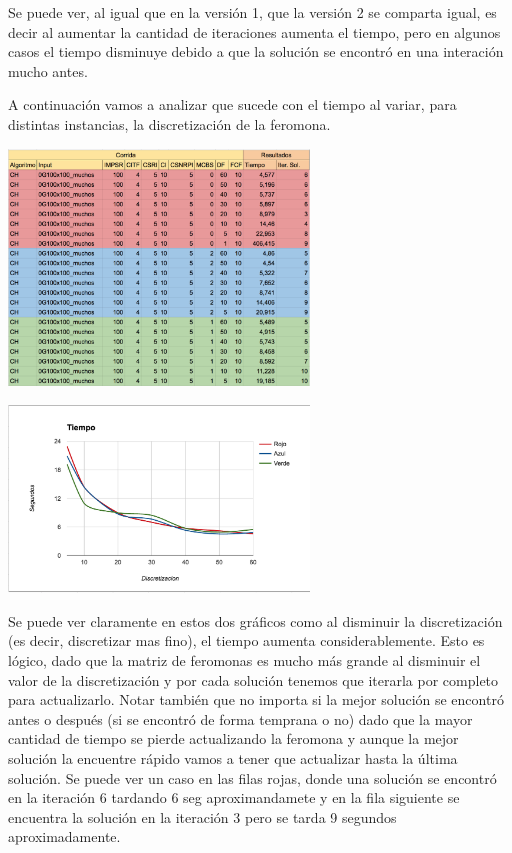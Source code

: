 Se puede ver, al igual que en la versi\'on 1, que la versi\'on 2 se comparta igual, es decir al aumentar la cantidad de iteraciones aumenta el tiempo, pero en algunos casos el tiempo disminuye debido a que la soluci\'on se encontr\'o en una interaci\'on mucho antes.

A continuaci\'on vamos a analizar que sucede con el tiempo al variar, para distintas instancias, la discretizaci\'on de la feromona. 

\begin{center}
\includegraphics[width=0.6\textwidth]{imagenes/tabla5}
\end{center}



\begin{center}
\includegraphics[width=0.6\textwidth]{imagenes/grafico3}
\end{center}




Se puede ver claramente en estos dos gr\'aficos como al disminuir la discretizaci\'on (es decir, discretizar mas fino), el tiempo aumenta considerablemente. Esto es l\'ogico, dado que la matriz de feromonas es mucho m\'as grande al disminuir el valor de la discretizaci\'on y por cada soluci\'on tenemos que iterarla por completo para actualizarlo.
Notar tambi\'en que no importa si la mejor soluci\'on se encontr\'o antes o despu\'es (si se encontr\'o de forma temprana o no) dado que la mayor cantidad de tiempo se pierde actualizando la feromona y aunque la mejor soluci\'on la encuentre r\'apido vamos a tener que actualizar hasta la \'ultima soluci\'on. Se puede ver un caso en las filas rojas, donde una soluci\'on se encontr\'o en la iteraci\'on 6 tardando 6 seg aproximandamete y en la fila siguiente se encuentra la soluci\'on en la iteraci\'on 3 pero se tarda 9 segundos aproximadamente.

